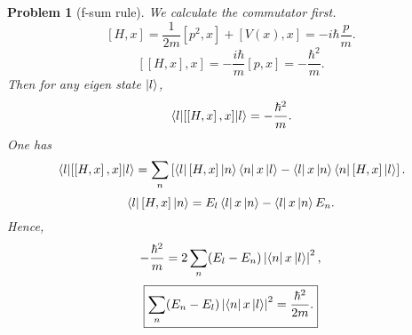 \documentclass{article}
\theoremstyle{1}
\newtheorem{problem}{Problem}
\begin{document}
\begin{problem}[f-sum rule]
    We calculate the commutator first.
    \begin{equation}
        \left[H,x\right]=\frac{1}{2m}\left[p^2,x\right]+\left[V(x),x\right]=-i\hbar\frac{p}{m}.
    \end{equation}
    \begin{equation}
        \left[\left[H,x\right],x\right]=-\frac{i\hbar}{m}\left[p,x\right]=-\frac{\hbar^2}{m}.
    \end{equation}
    Then for any eigen state $\ket{l}$,
    \begin{equation}
        \expval{\left[\left[H,x\right],x\right]}{l}=-\frac{\hbar^2}{m}.
    \end{equation}
    One has
    \begin{equation}
        \expval{\left[\left[H,x\right],x\right]}{l}=\sum_{n}\left[\bra{l}\left[H,x\right]\ket{n}\bra{n}x\ket{l}-\bra{l}x\ket{n}\bra{n}\left[H,x\right]\ket{l}\right].
    \end{equation}
    \begin{equation}
        \bra{l}\left[H,x\right]\ket{n}=E_l\bra{l}x\ket{n}-\bra{l}x\ket{n}E_n.
    \end{equation}
    Hence,
    \begin{equation}
        -\frac{\hbar^2}{m}=2\sum_{n}(E_l-E_n)\left|\bra{n}x\ket{l}\right|^2,
    \end{equation}
    \begin{equation}
        \boxed{\sum_{n}(E_n-E_l)\left|\bra{n}x\ket{l}\right|^2=\frac{\hbar^2}{2m}.}
    \end{equation}
\end{problem}
\end{document}
